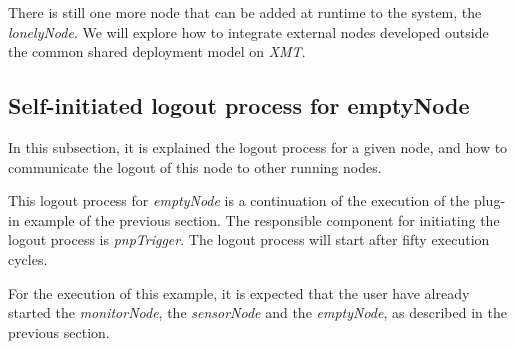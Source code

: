 There is still one more node that can be added at runtime to the system, the \emph{lonelyNode}. 
We will explore how to integrate external nodes developed outside the common shared deployment model on \emph{XMT}.

\subsection{Self-initiated logout process for emptyNode}

In this subsection, it is explained the logout process for a given node, and how to communicate the logout of this node to other running nodes. 

This logout process for \emph{emptyNode} is a continuation of the execution of the plug-in example of the previous section. 
The responsible component for initiating the logout process is \emph{pnpTrigger}. The logout process will start after fifty execution cycles. 

For the execution of this example, it is expected that the user have already started the \emph{monitorNode}, the \emph{sensorNode} and the \emph{emptyNode}, as described in the previous section. 

